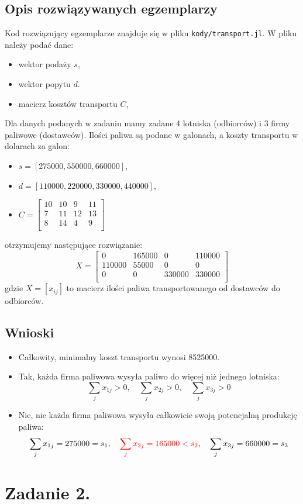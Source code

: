 \documentclass[11pt,a4paper]{article}
\numberwithin{equation}{section}
\begin{document}
\subsection{Opis rozwiązywanych egzemplarzy}
Kod rozwiązujący egzemplarze znajduje się w pliku \texttt{kody/transport.jl}. W pliku należy podać dane: 
\begin{itemize}
    \item wektor podaży $s$,
    \item wektor popytu $d$.
    \item macierz kosztów transportu $C$,
\end{itemize}
Dla danych podanych w zadaniu mamy zadane 4 lotniska (odbiorców) i 3 firmy paliwowe (dostawców). Ilości paliwa są podane w galonach, a koszty transportu w dolarach za galon:
\begin{itemize}
    \item $s = [275000, 550000, 660000]$,
    \item $d = [110000, 220000, 330000, 440000]$,
    \item $
        C = \begin{bmatrix}
            10 &10&9&11 \\
            7&11&12&13 \\
            8&14&4&9\\
        \end{bmatrix}
        $
\end{itemize}
otrzymujemy następujące rozwiązanie:
    \[
        X = \begin{bmatrix}
            0 & 165000 & 0 & 110000 \\
            110000 & 55000 & 0 & 0 \\
            0 & 0 & 330000 & 330000 \\
        \end{bmatrix}
    \]
    gdzie $X=[x_{ij}]$ to macierz ilości paliwa transportowanego od dostawców do odbiorców. 

\subsection{Wnioski}
\begin{itemize}
    \item Całkowity, minimalny koszt transportu wynosi \num{8525000}.
    \item Tak, każda firma paliwowa wysyła paliwo do więcej niż jednego lotniska:
        \[
            \sum_{j} x_{1j} > 0, \quad \sum_{j} x_{2j} > 0, \quad \sum_{j} x_{3j} > 0
        \]
    \item Nie, nie każda firma paliwowa wysyła całkowicie swoją potencjalną produkcję paliwa:
        \[
            \sum_{j} x_{1j} = 275000 = s_1, \quad \textcolor{red}{\sum_{j} x_{2j} = 165000 < s_2}, \quad \sum_{j} x_{3j} = 660000 = s_3
        \]
\end{itemize}

\section{Zadanie 2.}
\end{document}
